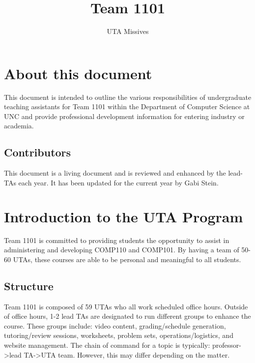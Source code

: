 \documentclass[a4paper]{article}
\title{Team 1101}
\author{UTA Missives}
\begin{document}
\maketitle
\clearpage
\startcontents[mainsections]
\clearpage
\section{About this document}

This document is intended to outline the various responsibilities of undergraduate teaching assistants for Team 1101 within the Department of Computer Science at UNC and provide professional development information for entering industry or academia. 

\subsection{Contributors}

This document is a living document and is reviewed and enhanced by the lead-TAs each year. It has been updated for the current year by Gabi Stein. 

\section{Introduction to the UTA Program}

Team 1101 is committed to providing students the opportunity to assist in administering and developing COMP110 and COMP101. By having a team of 50-60 UTAs, these courses are able to be personal and meaningful to all students. 

\subsection{Structure}

Team 1101 is composed of 59 UTAs who all work scheduled office hours. Outside of office hours, 1-2 lead TAs are designated to run different groups to enhance the course. These groups include: video content, grading/schedule generation, tutoring/review sessions, worksheets, problem sets,  operations/logistics, and website management. The chain of command for a topic is typically: professor->lead TA->UTA team. However, this may differ depending on the matter. 
\end{document}

